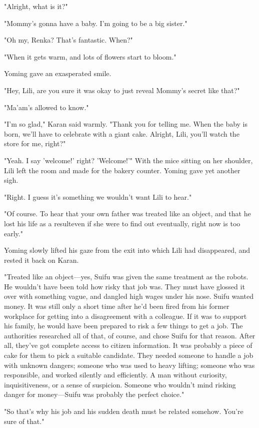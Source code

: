 "Alright, what is it?"

"Mommy's gonna have a baby. I'm going to be a big sister."

"Oh my, Renka? That's fantastic. When?"

"When it gets warm, and lots of flowers start to bloom."

Yoming gave an exasperated smile.

"Hey, Lili, are you sure it was okay to just reveal Mommy's secret like
that?"

"Ma'am's allowed to know."

"I'm so glad," Karan said warmly. "Thank you for telling me. When the
baby is born, we'll have to celebrate with a giant cake. Alright, Lili,
you'll watch the store for me, right?"

"Yeah. I say 'welcome!' right? 'Welcome!'" With the mice sitting on her
shoulder, Lili left the room and made for the bakery counter. Yoming
gave yet another sigh.

"Right. I guess it's something we wouldn't want Lili to hear."

"Of course. To hear that your own father was treated like an object, and
that he lost his life as a result\el even if she were to find out
eventually, right now is too early."

Yoming slowly lifted his gaze from the exit into which Lili had
disappeared, and rested it back on Karan.

"Treated like an object---yes, Suifu was given the same treatment as the
robots. He wouldn't have been told how risky that job was. They must
have glossed it over with something vague, and dangled high wages under
his nose. Suifu wanted money. It was still only a short time after he'd
been fired from his former workplace for getting into a disagreement
with a colleague. If it was to support his family, he would have been
prepared to risk a few things to get a job. The authorities researched
all of that, of course, and chose Suifu for that reason. After all,
they've got complete access to citizen information. It was probably a
piece of cake for them to pick a suitable candidate. They needed someone
to handle a job with unknown dangers; someone who was used to heavy
lifting; someone who was responsible, and worked silently and
efficiently. A man without curiosity, inquisitiveness, or a sense of
suspicion. Someone who wouldn't mind risking danger for money---Suifu was
probably the perfect choice."

"So that's why his job and his sudden death must be related somehow.
You're sure of that."

